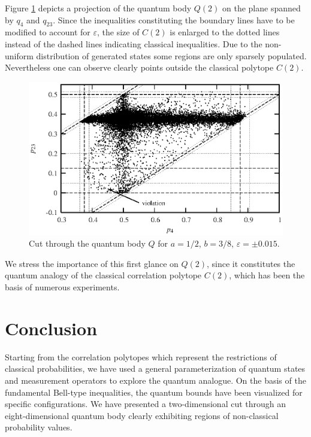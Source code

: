 \documentclass[pra,showpacs,showkeys,amsfonts]{revtex4}
\begin{document}
Figure \ref{f-2003-bell2hull}
depicts a projection of the quantum body $Q(2)$ on
the plane spanned by $q_{4}$ and $q_{23}$. Since the
inequalities constituting the boundary lines have to be modified to
account for $\varepsilon$, the size of $C(2)$ is enlarged
to the dotted lines instead of the dashed lines indicating classical
inequalities. Due to the non-uniform distribution of generated
states some regions are only sparsely populated.
Nevertheless one can
observe clearly points outside the classical polytope $C(2)$.
\begin{figure}[htbp]
  \centering
  \includegraphics{2003-qpoly-bell2}
  \caption{Cut through the quantum body $Q$ for $a=1/2$, $b=3/8$, $\varepsilon=\pm 0.015$.}
  \label{f-2003-bell2hull}
\end{figure}
We stress the importance of this first glance on $Q(2)$,
since it constitutes the quantum analogy
of the classical correlation polytope $C(2)$,
which has been the
basis of numerous experiments.


\section{Conclusion}

Starting from the correlation polytopes
which represent the restrictions of classical probabilities,
we have used a general parameterization of quantum states and
measurement operators to explore the quantum analogue.
On the basis of the fundamental Bell-type inequalities, the quantum
bounds have been visualized for specific configurations.
We have
presented a
two-dimensional cut through an eight-dimensional quantum body
clearly
exhibiting regions of non-classical probability values.
\end{document}
